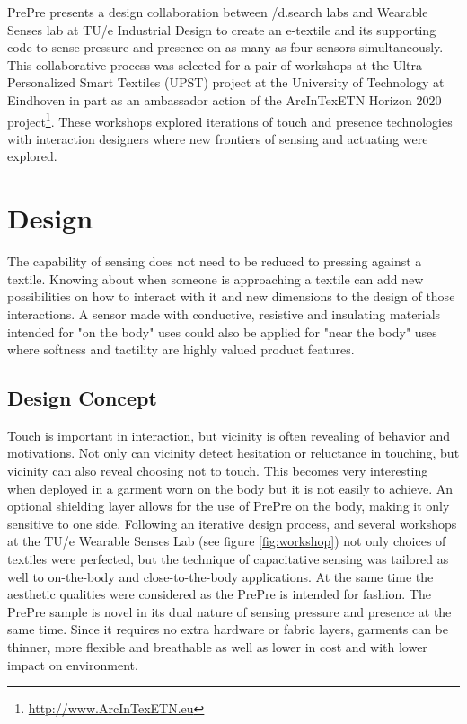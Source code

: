 \documentclass{sigchi-ext}
\begin{document}
PrePre presents a design collaboration between /d.search labs and Wearable Senses lab at TU/e Industrial Design to create an e-textile and its supporting code to sense pressure and presence on as many as four sensors simultaneously. This collaborative process was selected for a pair of workshops at the Ultra Personalized Smart Textiles (UPST) project at the University of Technology at Eindhoven in part as an ambassador action of the ArcInTexETN Horizon 2020 project\footnote{\url{http://www.ArcInTexETN.eu}}. These workshops explored iterations of touch and presence technologies with interaction designers where new frontiers of sensing and actuating were explored.  

\section{Design}
The capability of sensing does not need to be reduced to pressing against a textile. Knowing about when someone is approaching a textile can add new possibilities on how to interact with it and new dimensions to the design of those interactions. A sensor made with conductive, resistive and insulating materials  intended for "on the body" uses could also be applied for "near the body" uses where softness and tactility are highly valued product features.
\subsection{Design Concept}
Touch is important in interaction, but vicinity is often revealing of behavior and motivations. Not only can vicinity detect hesitation or reluctance in touching, but vicinity can also reveal choosing not to touch. This becomes very interesting when deployed in a garment worn on the body but it is not easily to achieve. An optional shielding layer allows for the use of PrePre on the body, making it only sensitive to one side. Following an iterative design process, and several workshops at the TU/e Wearable Senses Lab (see figure  \ref{fig:workshop}) not only choices of textiles were perfected, but the technique of capacitative sensing was tailored as well to on-the-body and close-to-the-body applications. At the same time the aesthetic qualities were considered as the PrePre is intended for fashion. The PrePre sample is novel in its dual nature of sensing pressure and presence at the same time. Since it requires no extra hardware or fabric layers, garments can be thinner, more flexible and breathable as well as lower in cost and with lower impact on environment. 
\end{document}
